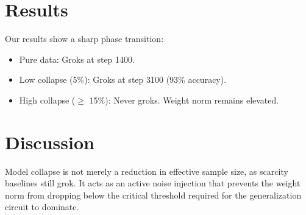 \documentclass{article}
\begin{document}
\section{Results}
Our results show a sharp phase transition:
\begin{itemize}
    \item Pure data: Groks at step 1400.
    \item Low collapse (5\%): Groks at step 3100 (93\% accuracy).
    \item High collapse ($\ge$ 15\%): Never groks. Weight norm remains elevated.
\end{itemize}

\section{Discussion}
Model collapse is not merely a reduction in effective sample size, as scarcity baselines still grok. It acts as an active noise injection that prevents the weight norm from dropping below the critical threshold required for the generalization circuit to dominate.



\end{document}
